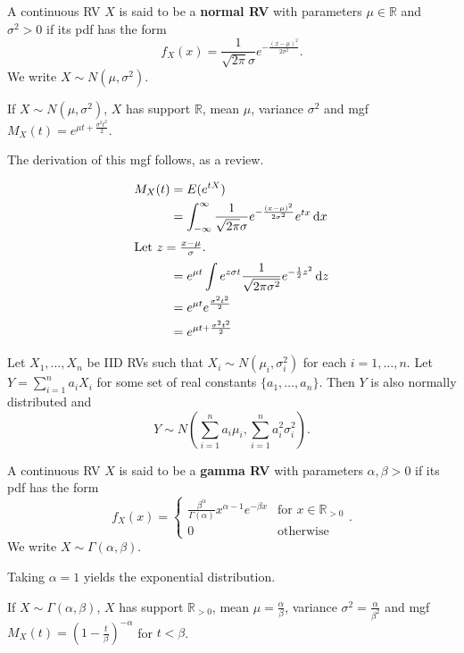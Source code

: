 \begin{definition}[normal RV]
	A continuous RV $X$ is said to be a \textbf{normal RV} with parameters $\mu\in\mathbb R$ and $\sigma^2>0$ if its pdf has the form
	$$f_X(x)=\frac{1}{\sqrt{2\pi}\sigma}e^{-\frac{(x-\mu)^2}{2\sigma^2}}.$$
	We write $X\sim N(\mu,\sigma^2)$.
\end{definition}

If $X\sim N(\mu,\sigma^2)$, $X$ has support $\mathbb R$, mean $\mu$, variance $\sigma^2$ and mgf $M_X(t)=e^{\mu t+\frac{\sigma^2 t^2}{2}}$.

The derivation of this mgf follows, as a review.

\begin{align*}
	M_X(t)&=E(e^{tX})\\
	&=\int_{-\infty}^\infty\frac{1}{\sqrt{2\pi}\sigma}e^{-\frac{(x-\mu)^2}{2\sigma^2}}e^{tx}\mathop{\mathrm{d}x}\\
	\intertext{Let $z=\frac{x-\mu}{\sigma}$.}
	&=e^{\mu t}\int e^{z\sigma t}\frac 1{\sqrt{2\pi\sigma^2}}e^{-\frac 12z^2}\mathop{\mathrm{d}z}\\
	&=e^{\mu t}e^{\frac{\sigma^2 t^2}{2}}\\
	&=e^{\mu t+\frac{\sigma^2 t^2}{2}}
\end{align*}

\begin{theorem}[]
	Let $X_1,\hdots,X_n$ be IID RVs such that $X_i\sim N(\mu_i,\sigma_i^2)$ for each $i=1,\hdots,n$. Let $Y=\sum_{i=1}^na_iX_i$ for some set of real constants $\{a_1,\hdots,a_n\}$. Then $Y$ is also normally distributed and
$$Y\sim N\left(\sum_{i=1}^na_i\mu_i,\sum_{i=1}^na_i^2\sigma_i^2\right).$$
\end{theorem}

\begin{definition}[gamma RV]
	A continuous RV $X$ is said to be a \textbf{gamma RV} with parameters $\alpha,\beta>0$ if its pdf has the form
	$$f_X(x)=\begin{cases}
		\frac{\beta^\alpha}{\Gamma(\alpha)} x^{\alpha - 1} e^{-\beta x } & \text{for $x\in\mathbb R_{>0}$}\\
		0 & \text{otherwise}
	\end{cases}.$$
	We write $X\sim \Gamma(\alpha,\beta)$.
\end{definition}

Taking $\alpha=1$ yields the exponential distribution.

If $X\sim \Gamma(\alpha,\beta)$, $X$ has support $\mathbb R_{>0}$, mean $\mu=\frac{\alpha}{\beta}$, variance $\sigma^2=\frac{\alpha}{\beta^2}$ and mgf $M_X(t)=\left(1 - \frac{t}{\beta}\right)^{-\alpha}$ for $t < \beta$.


